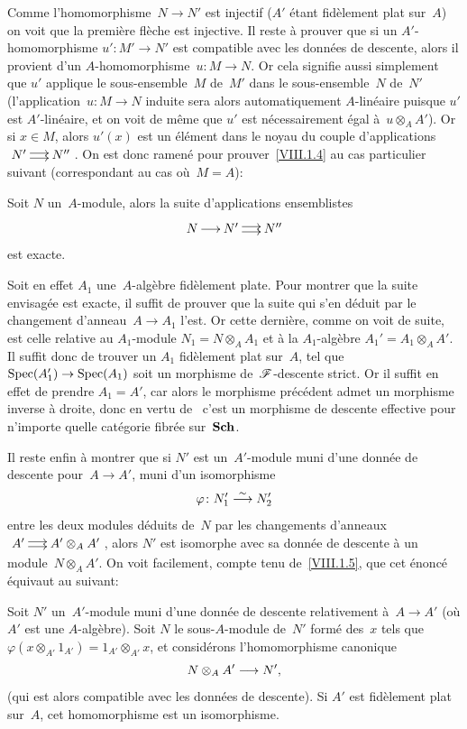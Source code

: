 Comme
l'homomorphisme~$N\to N'$ est injectif ($A'$ \'etant fid\`element
plat sur~$A$) on voit que la premi\`ere fl\`eche est injective. Il
reste \`a prouver que si un
$A'$-homomorphisme
$u'\colon M'\to N'$ est compatible avec les donn\'ees de descente,
alors il provient d'un $A$-homomorphisme~$u\colon M\to N$. Or cela
signifie aussi simplement que $u'$ applique le sous-ensemble~$M$
de~$M'$ dans le sous-ensemble~$N$ de~$N'$ (l'application~$u\colon M\to
N$ induite sera alors automatiquement $A$-lin\'eaire puisque $u'$
est $A'$-lin\'eaire, et on voit de m\^eme que $u'$ est
n\'ecessairement \'egal \`a~$u\otimes_{A}A'$). Or si $x\in M$,
alors $u'(x)$ est un \'el\'ement dans le noyau du couple
d'applications~$\xymatrix@C=.5cm{{N'}\ar@<2pt>[r]\ar@<-2pt>[r]&{N''}}$. On est
donc ramen\'e pour prouver~\ref{VIII.1.4}
au cas particulier suivant (correspondant au cas o\`u~$M=A$):

\begin{corollaire}
\label{VIII.1.5}
Soit $N$ un~$A$-module, alors la suite d'applications ensemblistes
$$
\xymatrix@C=.5cm{{N}\ar[r]&{N'}\ar@<2pt>[r]\ar@<-2pt>[r]&{N''}}
$$
est exacte.
\end{corollaire}

Soit en effet $A_{1}$ une~$A$-alg\`ebre fid\`element plate. Pour
montrer que la suite envisag\'ee est exacte, il suffit de prouver
que la suite qui s'en d\'eduit par le changement d'anneau~$A\to
A_{1}$ l'est. Or cette derni\`ere, comme on voit de suite, est celle
relative au
$A_1$-module
$N_{1}=N\otimes_{A}A_{1}$ et \`a la $A_{1}$-alg\`ebre
$A_{1}'=A_{1}\otimes_{A}A'$. Il suffit donc de trouver un $A_{1}$
fid\`element plat sur~$A$, tel que $\Spec(A_{1}')\to \Spec(A_{1})$
soit un morphisme de~$\cal{F}$-descente strict. Or il suffit en effet
de prendre $A_{1}=A'$, car alors le morphisme pr\'ec\'edent admet
un morphisme inverse \`a droite, donc en vertu de~\cite{VIII.D} c'est un
morphisme de descente effective pour n'importe quelle cat\'egorie
fibr\'ee sur~$\mathbf{Sch}$.

Il reste enfin \`a montrer que si $N'$ est un~$A'$-module muni d'une
donn\'ee de descente pour~$A\to A'$, \ie muni d'un isomorphisme
$$
\varphi\colon N_{1}'\overset{\sim}{\longrightarrow} N_{2}'
$$
entre les deux modules d\'eduits de~$N$ par les changements
d'anneaux $\xymatrix@C=.5cm{{A'}\ar@<2pt>[r]\ar@<-2pt>[r]&{A'\otimes_{A}A'}}$,
alors
$N'$ est isomorphe avec sa donn\'ee de descente \`a un
module~$N\otimes_{A}A'$. On voit facilement, compte tenu
de~\ref{VIII.1.5}, que cet \'enonc\'e \'equivaut au suivant:

\begin{lemme}
\label{VIII.1.6}
Soit $N'$ un~$A'$-module muni d'une donn\'ee de descente
relativement \`a~$A\to A'$ (o\`u $A'$ est une
$A$-alg\`ebre). Soit $N$ le sous-$A$-module de~$N'$ form\'e
des~$x$ tels que $\varphi(x\otimes_{A'}1_{A'})=1_{A'}\otimes_{A'}x$,
et consid\'erons l'homomorphisme canonique
$$
N\otimes_{A}A'\to N'\quoi,
$$
(qui est alors compatible avec les donn\'ees de descente). Si $A'$
est fid\`element plat sur~$A$, cet homomorphisme est un
isomorphisme.
\end{lemme}

